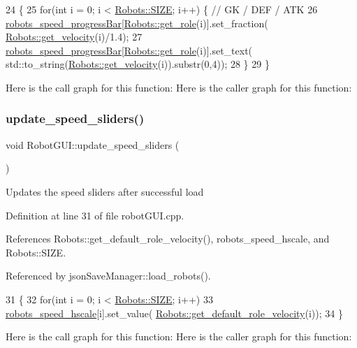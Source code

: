 \begin{DoxyCode}
24                                          \{
25     \textcolor{keywordflow}{for}(\textcolor{keywordtype}{int} i = 0; i < \hyperlink{class_robots_ae9df2f1d345ad6740f0459956cdd4712}{Robots::SIZE}; i++) \{ \textcolor{comment}{// GK / DEF / ATK}
26         \hyperlink{class_robot_g_u_i_a2c5103a4c119635536213e8c9dd6fc3f}{robots\_speed\_progressBar}[\hyperlink{class_robots_ac5cdd16502bd325581fb2d732169a326}{Robots::get\_role}(i)].set\_fraction(
      \hyperlink{class_robots_ac2b2d9709dd5d86723d9dc00dddaabaf}{Robots::get\_velocity}(i)/1.4);
27         \hyperlink{class_robot_g_u_i_a2c5103a4c119635536213e8c9dd6fc3f}{robots\_speed\_progressBar}[\hyperlink{class_robots_ac5cdd16502bd325581fb2d732169a326}{Robots::get\_role}(i)].set\_text(
      std::to\_string(\hyperlink{class_robots_ac2b2d9709dd5d86723d9dc00dddaabaf}{Robots::get\_velocity}(i)).substr(0,4));
28     \}
29 \}
\end{DoxyCode}
Here is the call graph for this function\+:
Here is the caller graph for this function\+:
\mbox{\label{class_robot_g_u_i_a7e7796fabb839c7eea5f82387fd10359}} 
\subsubsection{\texorpdfstring{update\+\_\+speed\+\_\+sliders()}{update\_speed\_sliders()}}
{\footnotesize\ttfamily void Robot\+G\+U\+I\+::update\+\_\+speed\+\_\+sliders (\begin{DoxyParamCaption}{ }\end{DoxyParamCaption})}

Updates the speed sliders after successful load 

Definition at line 31 of file robot\+G\+U\+I.\+cpp.



References Robots\+::get\+\_\+default\+\_\+role\+\_\+velocity(), robots\+\_\+speed\+\_\+hscale, and Robots\+::\+S\+I\+ZE.



Referenced by json\+Save\+Manager\+::load\+\_\+robots().


\begin{DoxyCode}
31                                     \{
32     \textcolor{keywordflow}{for}(\textcolor{keywordtype}{int} i = 0; i < \hyperlink{class_robots_ae9df2f1d345ad6740f0459956cdd4712}{Robots::SIZE}; i++)
33         \hyperlink{class_robot_g_u_i_a25c9dbce938a0b6fa4de5c7174d062af}{robots\_speed\_hscale}[i].set\_value(
      \hyperlink{class_robots_a4778a7c755c5cca4b5d1e2c3b46fb314}{Robots::get\_default\_role\_velocity}(i));
34 \}
\end{DoxyCode}
Here is the call graph for this function\+:
Here is the caller graph for this function\+:


